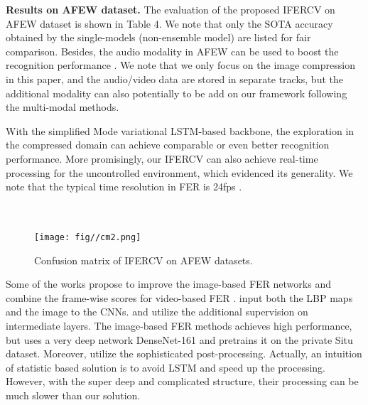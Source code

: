 \documentclass[a4paper,conference]{IEEEtran}
\begin{document}
\noindent\textbf{Results on AFEW dataset.} The evaluation of the proposed IFERCV on AFEW dataset is shown in Table 4. We note that only the SOTA accuracy obtained by the single-models (non-ensemble model) are listed for fair comparison. Besides, the audio modality in AFEW can be used to boost the recognition performance \cite{fan2017dynamic,fan2016video,vielzeuf2017temporal}. We note that we only focus on the image compression in this paper, and the audio/video data are stored in separate tracks, but the additional modality can also potentially to be add on our framework following the multi-modal methods\cite{fan2017dynamic,fan2016video}. 


With the simplified Mode variational LSTM-based \cite{baddar2019mode} backbone, the exploration in the compressed domain can achieve comparable or even better recognition performance. More promisingly, our IFERCV can also achieve real-time processing for the uncontrolled environment, which evidenced its generality. We note that the typical time resolution in FER is 24fps \cite{kim2017multi}. 


\begin{figure}[t]
\centering
~\\~\\\texttt{[image: fig//cm2.png]}\\
\caption{Confusion matrix of IFERCV on AFEW datasets.}\label{fig:5} 
\end{figure}




Some of the works propose to improve the image-based FER networks and combine the frame-wise scores for video-based FER \cite{yao2016holonet,hu2017learning,liu2018multi,fan2018video,meng2019frame}. \cite{yao2016holonet,hu2017learning} input both the LBP maps and the image to the CNNs. \cite{hu2017learning} and \cite{fan2018video} utilize the additional supervision on intermediate layers. The image-based FER methods \cite{liu2018multi} achieves high performance, but \cite{liu2018multi} uses a very deep network DenseNet-161 and pretrains it on the private Situ dataset. Moreover, \cite{liu2018multi} utilize the sophisticated post-processing. Actually, an intuition of statistic based solution is to avoid LSTM and speed up the processing. However, with the super deep and complicated structure, their processing can be much slower than our solution.  
\end{document}
